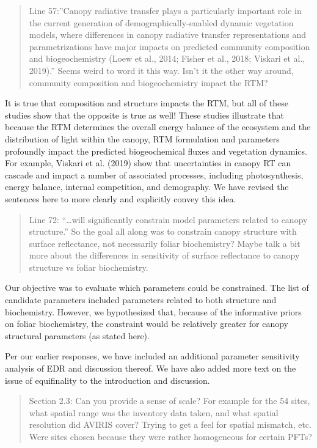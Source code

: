 
\begin{quote}
Line 57:”Canopy radiative transfer plays a particularly important role in the current generation of demographically-enabled dynamic vegetation models, where differences in canopy radiative transfer representations and parametrizations have major impacts on predicted community composition and biogeochemistry (Loew et al., 2014; Fisher et al., 2018; Viskari et al., 2019).” Seems weird to word it this way. Isn’t it the other way around, community composition and biogeochemistry impact the RTM?
\end{quote}

It is true that composition and structure impacts the RTM, but all of these studies show that the opposite is true as well! These studies illustrate  that because the RTM determines the overall energy balance of the ecosystem and the distribution of light within the canopy, RTM formulation and parameters profoundly impact the predicted biogeochemical fluxes and vegetation dynamics. For example, Viskari et al. (2019) show that uncertainties in canopy RT can cascade and impact a number of associated processes, including photosynthesis, energy balance, internal competition, and demography. We have revised the sentences here to more clearly and explicitly convey this idea.


\begin{quote}
  Line 72: “\ldots will significantly constrain model parameters related to canopy structure.” So the goal all along was to constrain canopy structure with surface reflectance, not necessarily foliar biochemistry? Maybe talk a bit more about the differences in sensitivity of surface reflectance to canopy structure vs foliar biochemistry.
\end{quote}

Our objective was to evaluate which parameters could be constrained. The list of candidate parameters included parameters related to both structure and biochemistry. However, we hypothesized that, because of the informative priors on foliar biochemistry, the constraint would be relatively greater for canopy structural parameters (as stated here).

Per our earlier responses, we have included an additional parameter sensitivity analysis of EDR and discussion thereof. We have also added more text on the issue of equifinality to the introduction and discussion.

\begin{quote}
  Section 2.3: Can you provide a sense of scale? For example for the 54 sites, what spatial range was the inventory data taken, and what spatial resolution did AVIRIS cover? Trying to get a feel for spatial mismatch, etc. Were sites chosen because they were rather homogeneous for certain PFTs?
\end{quote}

